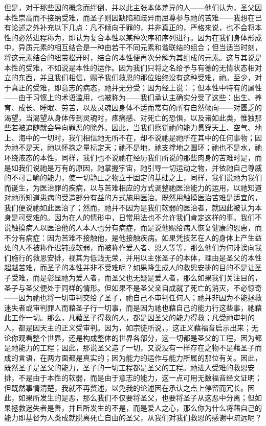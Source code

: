 但是，对于那些因的概念而绊倒，并以此主张本体差异的人——他们认为，圣父因本性崇高而不接纳受难，而圣子则因缺陷和歧异而屈尊参与祂的苦难——我想在已有论述之外补充以下几点：凡不倾向于罪的，并非真正的，严格来说，也不会将本性的必然进程称为，即认为复合本性以某种次序和序列进行。因为在我们身体形成中，异质元素的相互结合是一种由若干不同元素和谐联结的组合；但当适当时刻，将这元素结合的纽带松开时，结合的本性便再次分解为其组成的元素。这与其说是本性的受难，不如说是本性的运作。因为我们只将之名给予与有德的无情状态相对立的东西，并且我们相信，赐予我们救恩的那位始终没有这种受难，祂。至少，对于真正的受难，即意志的病态，祂并无分受；因为经上说：；但本性中特有的属性——由于习惯上的术语滥用，也被称为——我们承认主确实分受了这些：出生、养育、成长、睡眠、劳苦，以及灵魂因身体不适而常有的所有自然倾向——对匮乏的渴望，当渴望从身体传到灵魂时，疼痛感、对死亡的恐惧，以及诸如此类，惟独那些若被追随就会导向罪恶的除外。因此，当我们察觉祂的能力贯穿天上、空气、地上、海中的一切时，我们相信祂无所不在，却不说祂是祂所在其中的任何事物；因为祂不是天，祂以怀抱之量标定天；祂不是地，祂支撑地之圆环；祂也不是水，祂环绕液态的本性，同样，我们也不说祂在经历我们所说的那些肉身的苦难时是，而是如我们说祂是万有的原因，祂掌握宇宙，祂引导一切运动之物，并依祂自己尊威的不可言喻的能力，使一切静止之物立于固定的基础之上，同样，我们说祂为我们而诞生，为医治罪的疾病，以与苦难相应的方式调整祂医治能力的运用，以祂知道对祂所知道患病的受造部分有益的方式施用医治。既然用触摸医治苦难是适宜的，我们便说祂如此医治了；然而，祂并不因为是我们软弱的医治者，就因此被认为本身是可受难的。因为在人的情形中，日常用法也不允许我们肯定这样的事。我们不说触摸病人以医治他的人本人也分有病症，而是说他赐给病人恢复健康的恩惠，而不分有病症：因为苦难不接触他，是他接触疾病。如果凭技艺在人的身体上产生益处的人不被称作迟钝或软弱，而被称作爱人者、恩人等等，那么他们为何诽谤向我们施行的救恩安排，视其为低贱无荣，并用以主张圣子的本体，理由是圣父的本性超越苦难，而圣子的本性并非不受难呢？如果降生成人的救恩安排的目的不是让圣子受难，而是彰显祂为爱人者，而圣父也无疑是爱人者，那么如果我们关注目的，圣子与圣父便处于同样的情形。但如果不是圣父亲自成就了死亡的消灭，不必惊奇——因为祂也将一切审判交给了圣子，祂自己不审判任何人；祂并非因为不能拯救迷失者或审判罪人而藉圣子行一切事，而是因为祂也藉自己的能力行这些事，祂藉此工作一切。那么，凡藉圣子得救的人，都是因圣父的能力得救；凡受祂审判的人，都是因天主的正义受审判。因为，如宗徒所说，，这正义藉福音启示出来；无论你观看整个世界，还是构成整体的世界各部分，这一切都是圣父的工程，因为都是祂能力的工程；因此，那说圣父造了一切，又说没有一样存在之物不是藉圣子而成的言语，在两方面都是真实的；因为能力的运作与能力所属的那位有关。因此，既然圣子是圣父的能力，圣子的一切工程都是圣父的工程。祂进入受难的救恩安排，不是由于本性的软弱，而是由于意志的能力，这一点可用无数福音经文证明；但既然事情清楚，我就不再赘述，以免我的论述因在承认之点上停留而冗长。因此，如果所发生的是恶，那么我们不仅要将圣父，也要将圣子从这恶中分离；但如果拯救迷失者是善，并且所发生的不是，而是爱人之心，那么你为什么将藉自己的能力即基督为人类成就脱离死亡自由的圣父，从我们对我们救恩的感谢中疏远呢？\par

